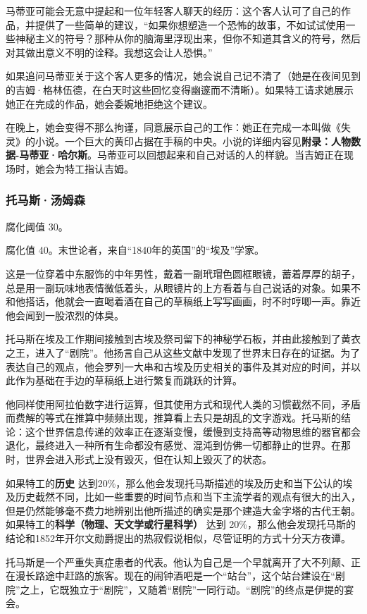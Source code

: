 马蒂亚可能会无意中提起和一位年轻客人聊天的经历：这个客人认可了自己的作品，并提供了一些简单的建议，“如果你想塑造一个恐怖的故事，不如试试使用一些神秘主义的符号？那种从你的脑海里浮现出来，但你不知道其含义的符号，然后对其做出意义不明的诠释。我想这会让人恐惧。”

如果追问马蒂亚关于这个客人更多的情况，她会说自己记不清了（她是在夜间见到的吉姆·格林伍德，在白天时这些回忆变得幽邃而不清晰）。如果特工请求她展示她正在完成的作品，她会委婉地拒绝这个建议。

在晚上，她会变得不那么拘谨，同意展示自己的工作：她正在完成一本叫做《失灵》的小说。一个巨大的黄印占据在手稿的中央。小说的详细内容见\textbf{附录：人物数据-马蒂亚·哈尔斯}。马蒂亚可以回想起来和自己对话的人的样貌。当吉姆正在现场时，她会为特工指认吉姆。

\subsubsection{托马斯·汤姆森}
腐化阈值 30。

腐化值 40。末世论者，来自“1840年的英国”的“埃及”学家。

这是一位穿着中东服饰的中年男性，戴着一副玳瑁色圆框眼镜，蓄着厚厚的胡子，总是用一副玩味地表情微低着头，从眼镜片的上方看着与自己说话的对象。如果不和他搭话，他就会一直喝着酒在自己的草稿纸上写写画画，时不时哼唧一声。靠近他会闻到一股浓烈的体臭。

托马斯在埃及工作期间接触到古埃及祭司留下的神秘学石板，并由此接触到了黄衣之王，进入了“剧院”。他扬言自己从这些文献中发现了世界末日存在的证据。为了表达自己的观点，他会罗列一大串和古埃及历史相关的事件及其对应的时间，并以此作为基础在手边的草稿纸上进行繁复而跳跃的计算。

他同样使用阿拉伯数字进行运算，但其使用方式和现代人类的习惯截然不同，矛盾而费解的等式在推算中频频出现，推算看上去只是胡乱的文字游戏。托马斯的结论：这个世界信息传递的效率正在逐渐变慢，缓慢到支持高等动物思维的器官都会退化，最终进入一种所有生命都没有感觉、混沌到仿佛一切都静止的世界。在那时，世界会进入形式上没有毁灭，但在认知上毁灭了的状态。

如果特工的\textbf{历史} 达到20\%，那么他会发现托马斯描述的埃及历史和当下公认的埃及历史截然不同，比如一些重要的时间节点和当下主流学者的观点有很大的出入，但是仍然能够毫不费力地辨别出他所描述的确实是那个建造大金字塔的古代王朝。如果特工的\textbf{科学（物理、天文学或行星科学）} 达到 20\%，那么他会发现托马斯的结论和1852年开尔文勋爵提出的热寂假说相似，尽管证明的方式十分天方夜谭。

托马斯是一个严重失真症患者的代表。他认为自己是一个早就离开了大不列颠、正在漫长路途中赶路的旅客。现在的闹钟酒吧是一个“站台”，这个站台建设在“剧院”之上，它既独立于“剧院”，又随着“剧院”一同行动。“剧院”的终点是伊提的宴会。

